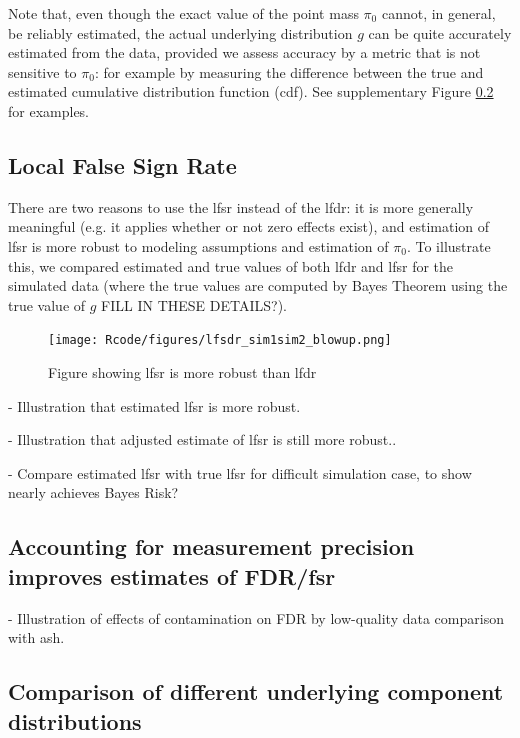 \documentclass[11pt]{article}
\begin{document}
Note that, even though the exact value of the point mass $\pi_0$ cannot, in general, be reliably estimated, the actual underlying distribution $g$ 
can be quite accurately estimated from the data, provided we assess accuracy by a metric that is not sensitive to $\pi_0$: for example
by measuring the difference between the true and estimated cumulative distribution function (cdf). See supplementary Figure \ref{} for examples.

\subsection*{Local False Sign Rate}

There are two reasons to use the lfsr instead of the lfdr: it is more generally meaningful (e.g. it applies
whether or not zero effects exist),  and estimation of lfsr is more robust to modeling assumptions and estimation of $\pi_0$. 
To illustrate this, we compared estimated and true values of both lfdr and lfsr for the simulated data (where the true
values are computed by Bayes Theorem using the true value of $g$ FILL IN THESE DETAILS?). 



\begin{figure}[!ht]
\begin{center}
\texttt{[image: Rcode/figures/lfsdr\_sim1sim2\_blowup.png]}
\end{center}
\caption{Figure showing lfsr is more robust than lfdr}
\end{figure}

- Illustration that estimated lfsr is more robust.

- Illustration that adjusted estimate of lfsr is still more robust..

- Compare estimated lfsr with true lfsr for difficult simulation case, to show nearly achieves Bayes Risk?

\subsection{Accounting for measurement precision improves estimates of FDR/fsr}
 
- Illustration of effects of contamination on FDR by low-quality data
comparison with ash.



\subsection{Comparison of different underlying component distributions}
\end{document}
